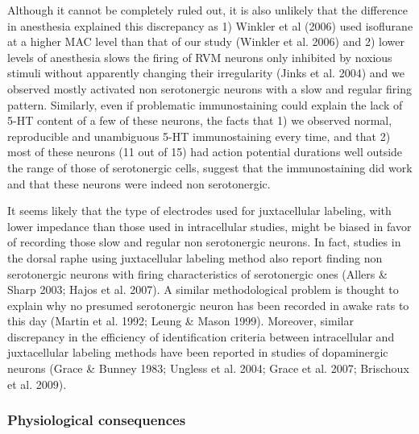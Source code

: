 \documentclass[a4paper,12pt,twoside]{report}
\begin{document}
Although it cannot be completely ruled out, it is also unlikely that the difference in anesthesia explained this discrepancy as 1) Winkler et al (2006) used isoflurane at a higher MAC level than that of our study (Winkler et al. 2006) and 2) lower levels of anesthesia slows the firing of RVM neurons only inhibited by noxious stimuli without apparently changing their irregularity (Jinks et al. 2004) and we observed mostly activated non serotonergic neurons with a slow and regular firing pattern. Similarly, even if problematic immunostaining could explain the lack of 5-HT content of a few of these neurons, the facts that 1) we observed normal, reproducible and unambiguous 5-HT immunostaining every time, and that 2) most of these neurons (11 out of 15) had action potential durations well outside the range of those of serotonergic cells, suggest that the immunostaining did work and that these neurons were indeed non serotonergic.

It seems likely that the type of electrodes used for juxtacellular labeling, with lower impedance than those used in intracellular studies, might be biased in favor of recording those slow and regular non serotonergic neurons. In fact, studies in the dorsal raphe using juxtacellular labeling method also report finding non serotonergic neurons with firing characteristics of serotonergic ones (Allers \& Sharp 2003; Hajos et al. 2007). A similar methodological problem is thought to explain why no presumed serotonergic neuron has been recorded in awake rats to this day (Martin et al. 1992; Leung \& Mason 1999). Moreover, similar discrepancy in the efficiency of identification criteria between intracellular and juxtacellular labeling methods have been reported in studies of dopaminergic neurons (Grace \& Bunney 1983; Ungless et al. 2004; Grace et al. 2007; Brischoux et al. 2009).

\subsubsection{Physiological consequences}
\end{document}
